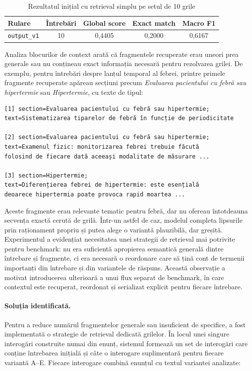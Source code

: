 \documentclass[12pt, a4paper, oneside, romanian]{teza-upb}
\begin{document}
\begin{table}[H]
\centering
\caption{Rezultatul inițial cu retrieval simplu pe setul de 10 grile}
\label{tab:experiment_initial_retrieval_v1}
\small
\begin{tabular}{lcccc}
\toprule
\textbf{Rulare} & \textbf{Întrebări} & \textbf{Global score} & \textbf{Exact match} & \textbf{Macro F1} \\
\midrule
\texttt{output\_v1} & 10 & 0,4405 & 0,2000 & 0,6167 \\
\bottomrule
\end{tabular}
\end{table}

Analiza blocurilor de context arată că fragmentele recuperate erau uneori prea generale sau nu conțineau exact informația necesară pentru rezolvarea grilei. De exemplu, pentru întrebări despre lanțul temporal al febrei, printre primele fragmente recuperate apăreau secțiuni precum \textit{Evaluarea pacientului cu febră sau hipertermie} sau \textit{Hipertermie}, cu texte de tipul:

\begin{lstlisting}[basicstyle=\ttfamily\footnotesize]
[1] section=Evaluarea pacientului cu febră sau hipertermie;
text=Sistematizarea tiparelor de febră în funcție de periodicitate

[2] section=Evaluarea pacientului cu febră sau hipertermie;
text=Examenul fizic: monitorizarea febrei trebuie făcută
folosind de fiecare dată aceeași modalitate de măsurare ...

[3] section=Hipertermie;
text=Diferențierea febrei de hipertermie: este esențială
deoarece hipertermia poate provoca rapid moartea ...
\end{lstlisting}

Aceste fragmente erau relevante tematic pentru febră, dar nu ofereau întotdeauna secvența exactă cerută de grilă. Într-un astfel de caz, modelul completa lipsurile prin raționament propriu și putea alege o variantă plauzibilă, dar greșită. Experimentul a evidențiat necesitatea unei strategii de retrieval mai potrivite pentru benchmark: nu era suficientă apropierea semantică generală dintre întrebare și fragmente, ci era necesară o reordonare care să țină cont de termenii importanți din întrebare și din variantele de răspuns. Această observație a motivat introducerea ulterioară a unui flux separat de benchmark, în care contextul este recuperat, reordonat și serializat explicit pentru fiecare întrebare.

\paragraph{Soluția identificată.}
Pentru a reduce numărul fragmentelor generale sau insuficient de specifice, a fost implementată o strategie de retrieval dedicată grilelor. În locul unei singure interogări construite numai din enunț, sistemul formează un set de interogări care conține întrebarea inițială și câte o interogare suplimentară pentru fiecare variantă A--E. Fiecare interogare combină enunțul cu textul variantei analizate:
\end{document}
